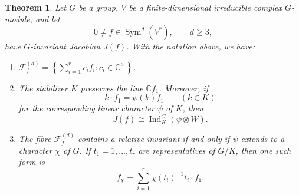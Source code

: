 \documentclass[11pt,reqno]{amsart}
\numberwithin{equation}{section}
\newtheorem{theorem}{Theorem}[section]
\theoremstyle{definition}
\theoremstyle{remark}
\newcommand{\C}{\mathbb C}
\newcommand{\Sym}{\operatorname{Sym}}
\newcommand{\Ind}{\operatorname{Ind}}
\newcommand{\cF}{\mathcal F}
\begin{document}
\begin{theorem}\label{thm:jacobian-structure}
Let $G$ be a group, $V$ be a finite-dimensional irreducible
complex $G$-module, and let
\[
  0\ne f\in\Sym^d(V^*),
  \qquad d\geq3,
\]
have $G$-invariant Jacobian $J(f)$.
With the notation above, we have:
\begin{enumerate}[label=\textup{(\roman*)},leftmargin=0.9cm]

\item $\cF_f^{(d)} =
  \left\{
    \sum_{i=1}^r c_i f_i:
    c_i\in\C^\times
  \right\}$.

\smallskip

\item
The stabilizer $K$ preserves the line $\C f_1$. Moreover, if
\[
  k\cdot f_1=\psi(k)f_1
  \qquad(k\in K)
\]
for the corresponding linear character $\psi$ of $K$, then
\[
  J(f)\cong\Ind_K^G(\psi\otimes W).
\]

\smallskip

\item
The fibre $\cF_f^{(d)}$ contains a relative invariant if and only if
$\psi$ extends to a character $\chi$ of $G$.  If
$t_1=1,\ldots,t_r$ are representatives of $G/K$, then one such form
is
\[
  f_\chi
  =
  \sum_{i=1}^r
  \chi(t_i)^{-1}t_i\cdot f_1.
\]

\end{enumerate}
\end{theorem}
\end{document}
